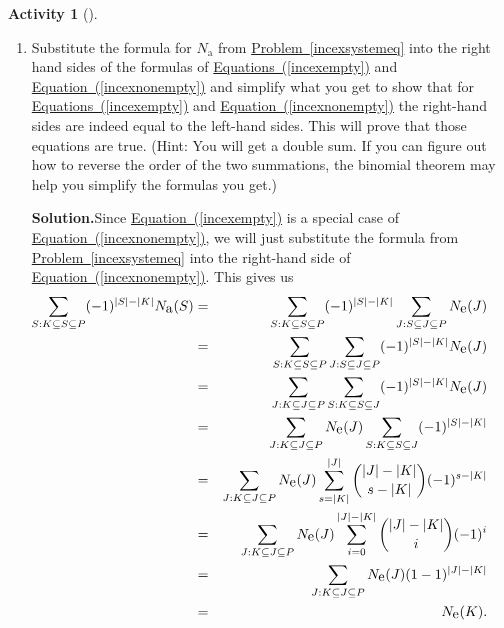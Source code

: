 \documentclass[10pt,]{book}
\theoremstyle{plain}
\theoremstyle{definition}
\newtheorem{activity}[project]{Activity}
\numberwithin{equation}{chapter}
\newcommand{\amp}{&}
\begin{document}
\begin{activity}[]\label{activity-108}
~\par
\begin{enumerate}[label=(\alph*)]
 \item Substitute the formula for \(N_{\mbox{a} }\) from \hyperref[incexsystemeq]{Problem~\ref{incexsystemeq}} into the right hand sides of the formulas of \hyperref[incexempty]{Equations~(\ref{incexempty})} and \hyperref[incexnonempty]{Equation~(\ref{incexnonempty})} and simplify what you get to show that for \hyperref[incexempty]{Equations~(\ref{incexempty})} and \hyperref[incexnonempty]{Equation~(\ref{incexnonempty})} the right-hand sides are indeed equal to the left-hand sides. This will prove that those equations are true. (Hint: You will get a double sum. If you can figure out how to reverse the order of the two summations, the binomial theorem may help you simplify the formulas you get.)%
\par\medskip\noindent%
\textbf{Solution.}\quad Since \hyperref[incexempty]{Equation~(\ref{incexempty})} is a special case of \hyperref[incexnonempty]{Equation~(\ref{incexnonempty})}, we will just substitute the formula from \hyperref[incexsystemeq]{Problem~\ref{incexsystemeq}} into the right-hand side of \hyperref[incexnonempty]{Equation~(\ref{incexnonempty})}. This gives us%
\begin{align*}
\hspace{-.25 in}\sum_{S: K\subseteq S\subseteq P}
(-1)^{|S|-|K|}N_{\mbox{a} }(S)\amp =\amp \sum_{S: K\subseteq S\subseteq P}
(-1)^{|S|-|K|}\sum_{J: S\subseteq
J\subseteq P}N_{\mbox{e} }(J)\\
\amp =\amp \sum_{S: K\subseteq S\subseteq P}
\sum_{J: S\subseteq
J\subseteq P}(-1)^{|S|-|K|}N_{\mbox{e} }(J)\\
\amp =\amp \sum_{J:K\subseteq J\subseteq P}\sum_{S:K\subseteq S\subseteq J}
(-1)^{|S|-|K|}N_{\mbox{e} }(J)\\
\amp =\amp \sum_{J:K\subseteq J\subseteq P}N_{\mbox{e} }(J)\sum_{S:K\subseteq
S\subseteq J} (-1)^{|S|-|K|}\\
\amp =\amp \sum_{J:K\subseteq J\subseteq P}N_{\mbox{e} }(J)\sum_{s=|K|}^{|J|}
{|J|-|K|
\choose s-|K|}(-1)^{s-|K|}\\
\amp =\amp \sum_{J:K\subseteq J\subseteq P}N_{\mbox{e} }(J)\sum_{i=0}^{|J|-|K|}
{|J|-|K|
\choose i}(-1)^{i}\\
\amp =\amp \sum_{J:K\subseteq J\subseteq
P}N_{\mbox{e} }(J)(1-1)^{|J|-|K|}\\
\amp =\amp N_{\mbox{e} }(K).
\end{align*}

\end{enumerate}
\end{activity}
\end{document}
